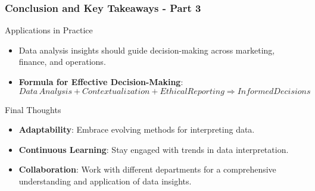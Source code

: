 \documentclass[aspectratio=169]{beamer}
\begin{document}
\begin{frame}[fragile]
    \frametitle{Conclusion and Key Takeaways - Part 3}
    \begin{block}{Applications in Practice}
        \begin{itemize}
            \item Data analysis insights should guide decision-making across marketing, finance, and operations.
            \item \textbf{Formula for Effective Decision-Making}:
                \begin{equation}
                Data \, Analysis + Contextualization + Ethical Reporting \Rightarrow Informed Decisions
                \end{equation}
        \end{itemize}
    \end{block}
    
    \begin{block}{Final Thoughts}
        \begin{itemize}
            \item \textbf{Adaptability}: Embrace evolving methods for interpreting data.
            \item \textbf{Continuous Learning}: Stay engaged with trends in data interpretation.
            \item \textbf{Collaboration}: Work with different departments for a comprehensive understanding and application of data insights.
        \end{itemize}
    \end{block}
\end{frame}
\end{document}
